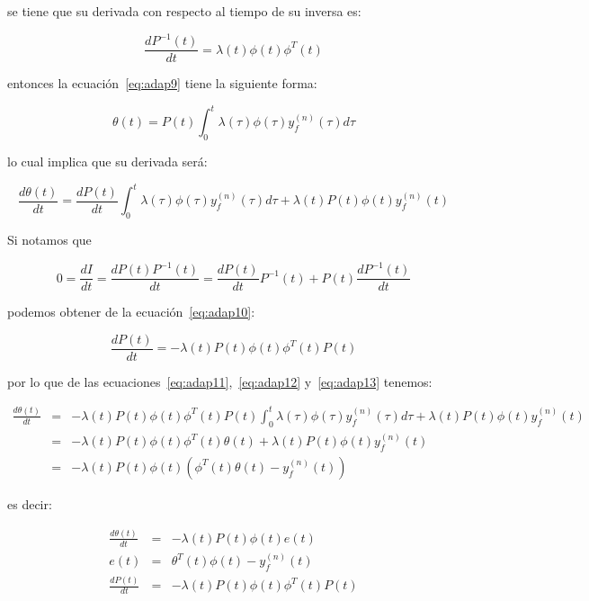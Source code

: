             se tiene que su derivada con respecto al tiempo de su inversa es:

            \begin{equation} \label{eq:adap10}
                \frac{d P^{-1}(t)}{dt} = \lambda(t) \phi(t) \phi^T(t)
            \end{equation}

            entonces la ecuación~\ref{eq:adap9} tiene la siguiente forma:

            \begin{equation} \label{eq:adap11}
                \theta(t) = P(t) \int_0^t \lambda(\tau) \phi(\tau) y_f^{(n)}(\tau) d\tau
            \end{equation}

            lo cual implica que su derivada será:

            \begin{equation} \label{eq:adap12}
                \frac{d \theta(t)}{dt} = \frac{d P(t)}{dt} \int_0^t \lambda(\tau) \phi(\tau) y_f^{(n)}(\tau) d\tau + \lambda(t) P(t) \phi(t) y_f^{(n)}(t)
            \end{equation}

            Si notamos que

            \begin{equation*}
                0 = \frac{dI}{dt} = \frac{dP(t) P^{-1}(t)}{dt} = \frac{dP(t)}{dt} P^{-1}(t) + P(t) \frac{dP^{-1}(t)}{dt}
            \end{equation*}

            podemos obtener de la ecuación~\ref{eq:adap10}:

            \begin{equation} \label{eq:adap13}
                \frac{d P(t)}{dt} = - \lambda(t) P(t) \phi(t) \phi^T(t) P(t)
            \end{equation}

            por lo que de las ecuaciones~\ref{eq:adap11},~\ref{eq:adap12} y~\ref{eq:adap13} tenemos:

            \begin{eqnarray*}
                \frac{d \theta(t)}{dt} & = & - \lambda(t) P(t) \phi(t) \phi^T(t) P(t) \int_0^t \lambda(\tau) \phi(\tau) y_f^{(n)}(\tau) d\tau + \lambda(t) P(t) \phi(t) y_f^{(n)}(t) \\
                & = & - \lambda(t) P(t) \phi(t) \phi^T(t) \theta(t) + \lambda(t) P(t) \phi(t) y_f^{(n)}(t) \\
                & = & - \lambda(t) P(t) \phi(t) \left( \phi^T(t) \theta(t) - y_f^{(n)}(t) \right)
            \end{eqnarray*}

            es decir:

            \begin{eqnarray}
                \frac{d \theta(t)}{dt} & = & - \lambda(t) P(t) \phi(t) e(t) \nonumber \\
                e(t) & = & \theta^T(t) \phi(t) - y_f^{(n)}(t) \nonumber \\
                \frac{d P(t)}{dt} & = & - \lambda(t) P(t) \phi(t) \phi^T(t) P(t)
            \end{eqnarray}
